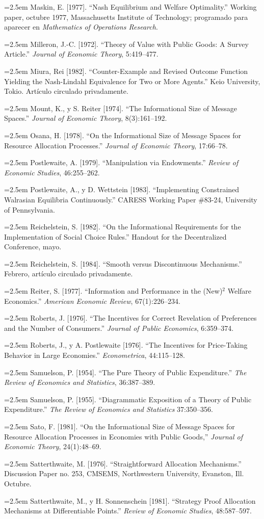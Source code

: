 \documentclass[12pt, letterpaper]{article}
\newcommand{\bibentry}[1]{\noindent\hangindent=2.5em\hangafter=1 \small #1 \par\vspace{0.75em}}
\begin{document}
\bibentry{Maskin, E. [1977]. ``Nash Equilibrium and Welfare Optimality.'' Working paper, octubre 1977, Massachusetts Institute of Technology; programado para aparecer en \textit{Mathematics of Operations Research}.}
\bibentry{Milleron, J.-C. [1972]. ``Theory of Value with Public Goods: A Survey Article.'' \textit{Journal of Economic Theory}, 5:419--477.}
\bibentry{Miura, Rei [1982]. ``Counter-Example and Revised Outcome Function Yielding the Nash-Lindahl Equivalence for Two or More Agents.'' Keio University, Tokio. Artículo circulado privadamente.}
\bibentry{Mount, K., y S. Reiter [1974]. ``The Informational Size of Message Spaces.'' \textit{Journal of Economic Theory}, 8(3):161--192.}
\bibentry{Osana, H. [1978]. ``On the Informational Size of Message Spaces for Resource Allocation Processes.'' \textit{Journal of Economic Theory}, 17:66--78.}
\bibentry{Postlewaite, A. [1979]. ``Manipulation via Endowments.'' \textit{Review of Economic Studies}, 46:255--262.}
\bibentry{Postlewaite, A., y D. Wettstein [1983]. ``Implementing Constrained Walrasian Equilibria Continuously.'' CARESS Working Paper \#83-24, University of Pennsylvania.}
\bibentry{Reichelstein, S. [1982]. ``On the Informational Requirements for the Implementation of Social Choice Rules.'' Handout for the Decentralized Conference, mayo.}
\bibentry{Reichelstein, S. [1984]. ``Smooth versus Discontinuous Mechanisms.'' Febrero, artículo circulado privadamente.}
\bibentry{Reiter, S. [1977]. ``Information and Performance in the (New)$^2$ Welfare Economics.'' \textit{American Economic Review}, 67(1):226--234.}
\bibentry{Roberts, J. [1976]. ``The Incentives for Correct Revelation of Preferences and the Number of Consumers.'' \textit{Journal of Public Economics}, 6:359--374.}
\bibentry{Roberts, J., y A. Postlewaite [1976]. ``The Incentives for Price-Taking Behavior in Large Economies.'' \textit{Econometrica}, 44:115--128.}
\bibentry{Samuelson, P. [1954]. ``The Pure Theory of Public Expenditure.'' \textit{The Review of Economics and Statistics}, 36:387--389.}
\bibentry{Samuelson, P. [1955]. ``Diagrammatic Exposition of a Theory of Public Expenditure.'' \textit{The Review of Economics and Statistics} 37:350--356.}
\bibentry{Sato, F. [1981]. ``On the Informational Size of Message Spaces for Resource Allocation Processes in Economies with Public Goods,'' \textit{Journal of Economic Theory}, 24(1):48--69.}
\bibentry{Satterthwaite, M. [1976]. ``Straightforward Allocation Mechanisms.'' Discussion Paper no. 253, CMSEMS, Northwestern University, Evanston, Ill. Octubre.}
\bibentry{Satterthwaite, M., y H. Sonnenschein [1981]. ``Strategy Proof Allocation Mechanisms at Differentiable Points.'' \textit{Review of Economic Studies}, 48:587--597.}
\end{document}
